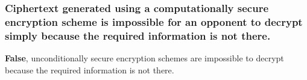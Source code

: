 \documentclass{report}
\begin{document}
			\subsubsection{Ciphertext generated using a computationally secure encryption scheme is impossible for an opponent to decrypt simply because the required information is not there.}
			\startsubsection
				\textbf{False}, unconditionally secure encryption schemes are impossible to decrypt because the required information is not there.
			\closesection
		\closesection
	\closesection
\end{document}

